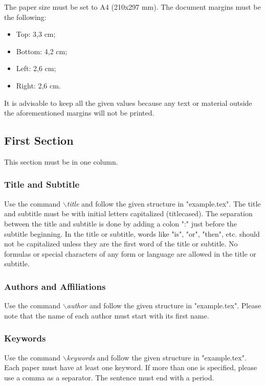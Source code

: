 \documentclass[a4paper,twoside]{article}
\begin{document}
The paper size must be set to A4 (210x297 mm). The document
margins must be the following:

\begin{itemize}
    \item Top: 3,3 cm;
    \item Bottom: 4,2 cm;
    \item Left: 2,6 cm;
    \item Right: 2,6 cm.
\end{itemize}

It is advisable to keep all the given values because any text or
material outside the aforementioned margins will not be printed.


\subsection{First Section}

This section must be in one column.

\subsubsection{Title and Subtitle}

Use the command \textit{$\backslash$title} and follow the given structure in "example.tex". The title and subtitle must be with initial letters
capitalized (titlecased). The separation between the title and subtitle is done by adding a colon ":" just before the subtitle beginning. In the title or subtitle, words like "is", "or", "then", etc. should not be capitalized unless they are the first word of the title or subtitle. No formulas or special characters of any form or language are allowed in the title or subtitle.

\subsubsection{Authors and Affiliations}

Use the command \textit{$\backslash$author} and follow the given structure in "example.tex". Please note that the name of each author must start with its first name.

\subsubsection{Keywords}

Use the command \textit{$\backslash$keywords} and follow the given structure in "example.tex". Each paper must have at least one keyword. If more than one is specified, please use a comma as a separator. The sentence must end with a period.
\end{document}
